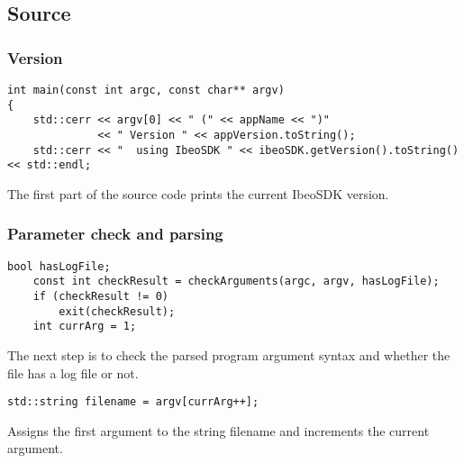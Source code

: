 \subsection{Source}
\subsubsection{Version}
\begin{lstlisting}
int main(const int argc, const char** argv)
{
    std::cerr << argv[0] << " (" << appName << ")"
	    	  << " Version " << appVersion.toString();
    std::cerr << "  using IbeoSDK " << ibeoSDK.getVersion().toString() << std::endl;
\end{lstlisting}
The first part of the source code prints the current IbeoSDK version.
\subsubsection{Parameter check and parsing}
\begin{lstlisting}[firstnumber=last]
    bool hasLogFile;
    const int checkResult = checkArguments(argc, argv, hasLogFile);
    if (checkResult != 0)
    	exit(checkResult);
    int currArg = 1;
\end{lstlisting}
The next step is to check the parsed program argument syntax and whether the file has a log file or not.
\begin{lstlisting}[firstnumber=last]
    std::string filename = argv[currArg++];
\end{lstlisting}
Assigns the first argument to the string filename and increments the current argument.
